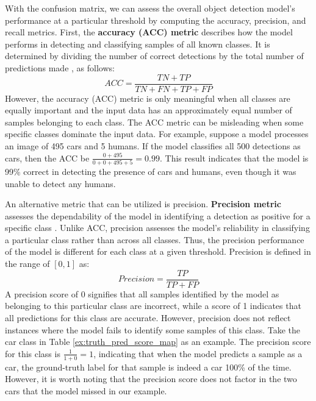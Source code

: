 With the confusion matrix, we can assess the overall object detection model's performance at a particular threshold by computing the accuracy, precision, and recall metrics. First, the \textbf{accuracy (ACC) metric} describes how the model performs in detecting and classifying samples of all known classes. It is determined by dividing the number of correct detections by the total number of predictions made \cite{szeliski_cv_book}, as follows:
\begin{equation}
    ACC = \frac{TN+TP}{TN+FN+TP+FP} \label{eq:accuracy}
\end{equation}
However, the accuracy (ACC) metric is only meaningful when all classes are equally important and the input data has an approximately equal number of samples belonging to each class. The ACC metric can be misleading when some specific classes dominate the input data. For example, suppose a model processes an image of 495 cars and 5 humans. If the model classifies all 500 detections as cars, then the ACC be $\frac{0+495}{0+0+495+5}=0.99$. This result indicates that the model is 99\% correct in detecting the presence of cars and humans, even though it was unable to detect any humans.

An alternative metric that can be utilized is precision. \textbf{Precision metric} assesses the dependability of the model in identifying a detection as positive for a specific class \cite{metrics_survey_2020}. Unlike ACC, precision assesses the model's reliability in classifying a particular class rather than across all classes. Thus, the precision performance of the model is different for each class at a given threshold. Precision is defined in the range of $[0,1]$  as:
\begin{equation}
    Precision = \frac{TP}{TP+FP} \label{eq:precision}
\end{equation}
A precision score of 0 signifies that all samples identified by the model as belonging to this particular class are incorrect, while a score of 1 indicates that all predictions for this class are accurate. However, precision does not reflect instances where the model fails to identify some samples of this class. Take the car class in Table \ref{ex:truth_pred_score_map} as an example. The precision score for this class is $\frac{1}{1+0}=1$, indicating that when the model predicts a sample as a car, the ground-truth label for that sample is indeed a car 100\% of the time. However, it is worth noting that the precision score does not factor in the two cars that the model missed in our example.

